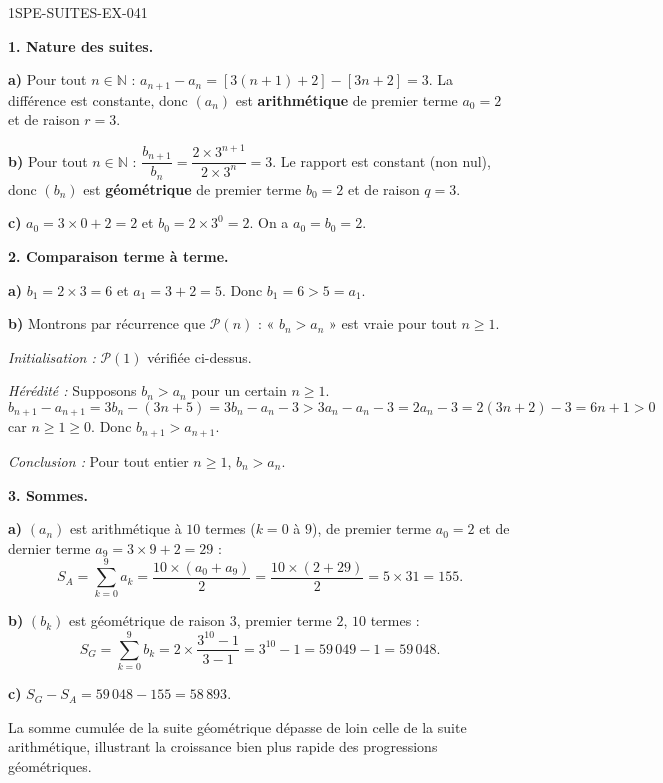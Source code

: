 \begin{corrige}{1SPE-SUITES-EX-041}

\textbf{1. Nature des suites.}

\textbf{a)} Pour tout $n \in \mathbb{N}$ : $a_{n+1} - a_n = [3(n+1)+2] - [3n+2] = 3$. La différence est constante, donc $(a_n)$ est \textbf{arithmétique} de premier terme $a_0 = 2$ et de raison $r = 3$.

\textbf{b)} Pour tout $n \in \mathbb{N}$ : $\dfrac{b_{n+1}}{b_n} = \dfrac{2 \times 3^{n+1}}{2 \times 3^n} = 3$. Le rapport est constant (non nul), donc $(b_n)$ est \textbf{géométrique} de premier terme $b_0 = 2$ et de raison $q = 3$.

\textbf{c)} $a_0 = 3 \times 0 + 2 = 2$ et $b_0 = 2 \times 3^0 = 2$. On a $a_0 = b_0 = 2$.

\textbf{2. Comparaison terme à terme.}


\textbf{a)} $b_1 = 2 \times 3 = 6$ et $a_1 = 3 + 2 = 5$. Donc $b_1 = 6 > 5 = a_1$. \checkmark

\textbf{b)} Montrons par récurrence que $\mathcal{P}(n)$ : « $b_n > a_n$ » est vraie pour tout $n \geq 1$.

\textit{Initialisation :} $\mathcal{P}(1)$ vérifiée ci-dessus.

\textit{Hérédité :} Supposons $b_n > a_n$ pour un certain $n \geq 1$.
\[
b_{n+1} - a_{n+1} = 3b_n - (3n+5) = 3b_n - a_n - 3 > 3a_n - a_n - 3 = 2a_n - 3 = 2(3n+2) - 3 = 6n+1 > 0
\]
car $n \geq 1 \geq 0$. Donc $b_{n+1} > a_{n+1}$.

\textit{Conclusion :} Pour tout entier $n \geq 1$, $b_n > a_n$.

\textbf{3. Sommes.}

\textbf{a)} $(a_n)$ est arithmétique à $10$ termes ($k = 0$ à $9$), de premier terme $a_0 = 2$ et de dernier terme $a_9 = 3 \times 9 + 2 = 29$ :
\[
S_A = \sum_{k=0}^{9} a_k = \frac{10 \times (a_0 + a_9)}{2} = \frac{10 \times (2+29)}{2} = 5 \times 31 = 155.
\]

\textbf{b)} $(b_k)$ est géométrique de raison $3$, premier terme $2$, $10$ termes :
\[
S_G = \sum_{k=0}^{9} b_k = 2 \times \frac{3^{10} - 1}{3-1} = 3^{10} - 1 = 59\,049 - 1 = 59\,048.
\]

\textbf{c)} $S_G - S_A = 59\,048 - 155 = 58\,893$.

La somme cumulée de la suite géométrique dépasse de loin celle de la suite arithmétique, illustrant la croissance bien plus rapide des progressions géométriques.


\end{corrige}

